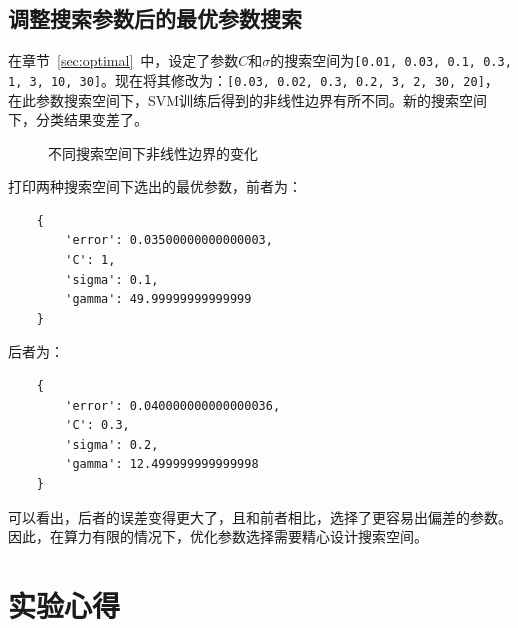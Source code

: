 \documentclass{SEU-AI-Report}
\begin{document}
\subsection{调整搜索参数后的最优参数搜索}
在章节~\ref{sec:optimal}~中，设定了参数$C$和$\sigma$的搜索空间为\texttt{[0.01, 0.03, 0.1, 0.3, 1, 3, 10, 30]}。现在将其修改为：\texttt{[0.03, 0.02, 0.3, 0.2, 3, 2, 30, 20]}，在此参数搜索空间下，SVM训练后得到的非线性边界有所不同。新的搜索空间下，分类结果变差了。
\begin{figure}[htbp]
    \centering
    \hfill
    \caption{不同搜索空间下非线性边界的变化}  
\end{figure}

打印两种搜索空间下选出的最优参数，前者为：
\begin{verbatim}
    {
        'error': 0.03500000000000003,
        'C': 1,
        'sigma': 0.1,
        'gamma': 49.99999999999999
    }
\end{verbatim}


后者为：
\begin{verbatim}
    {
        'error': 0.040000000000000036, 
        'C': 0.3, 
        'sigma': 0.2, 
        'gamma': 12.499999999999998
    }  
\end{verbatim}



可以看出，后者的误差变得更大了，且和前者相比，选择了更容易出偏差的参数。因此，在算力有限的情况下，优化参数选择需要精心设计搜索空间。
\section{实验心得}
\end{document}
